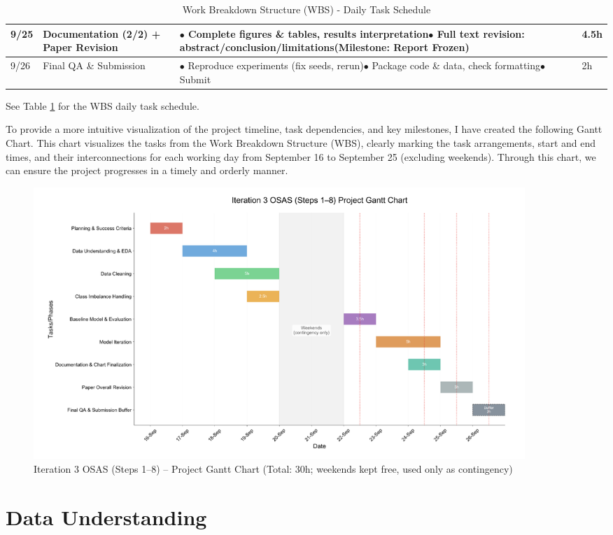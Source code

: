 \documentclass[sigplan,screen]{acmart}
\begin{document}
\begin{table}[h!]
\begin{tabular}{|p{1.0cm}|p{2.0cm}|p{3.5cm}|p{1.0cm}|}
\hline
9/25 & Documentation (2/2) + Paper Revision & $\bullet$ Complete figures \& tables, results interpretation\newline $\bullet$ Full text revision: abstract/conclusion/limitations\newline (Milestone: Report Frozen) & 4.5h \\[2pt]
\hline
9/26 & Final QA \& Submission & $\bullet$ Reproduce experiments (fix seeds, rerun)\newline $\bullet$ Package code \& data, check formatting\newline $\bullet$ Submit & 2h \\[2pt]
\hline
\end{tabular}
\caption{Work Breakdown Structure (WBS) - Daily Task Schedule}
\label{tab:wbs_schedule}
\end{table}

See Table \ref{tab:wbs_schedule} for the WBS daily task schedule.

To provide a more intuitive visualization of the project timeline, task dependencies, and key milestones, I have created the following Gantt Chart. This chart visualizes the tasks from the Work Breakdown Structure (WBS), clearly marking the task arrangements, start and end times, and their interconnections for each working day from September 16 to September 25 (excluding weekends). Through this chart, we can ensure the project progresses in a timely and orderly manner.

\begin{figure}[h!]
    \centering
    \includegraphics[width=0.9\textwidth]{1.4.png}
    \caption{Iteration 3 OSAS (Steps 1--8) -- Project Gantt Chart (Total: 30h; weekends kept free, used only as contingency)}
    \label{fig:gantt_chart}
\end{figure}

\section{Data Understanding}
\end{document}
